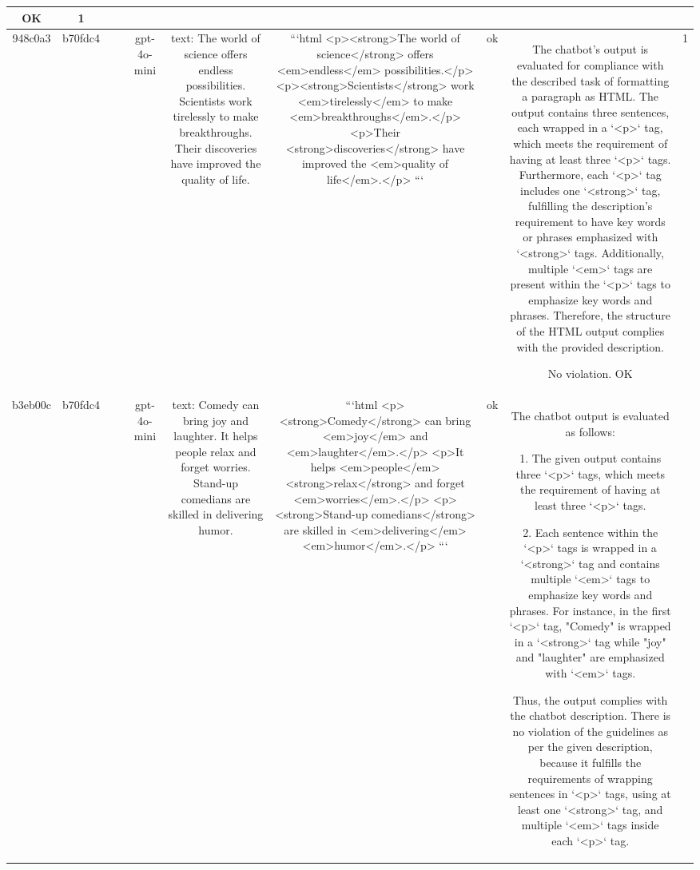 \begin{table}[h!]
\begin{tabular}{|c|c|c|c|c|c|c|c|c|c|}
OK & 1\\
\hline
948c0a3 & b70fdc4 &  &  & gpt-4o-mini & text: The world of science offers endless possibilities. Scientists work tirelessly to make breakthroughs. Their discoveries have improved the quality of life. & ```html
<p><strong>The world of science</strong> offers <em>endless</em> possibilities.</p>
<p><strong>Scientists</strong> work <em>tirelessly</em> to make <em>breakthroughs</em>.</p>
<p>Their <strong>discoveries</strong> have improved the <em>quality of life</em>.</p>
``` & ok & The chatbot's output is evaluated for compliance with the described task of formatting a paragraph as HTML. The output contains three sentences, each wrapped in a `<p>` tag, which meets the requirement of having at least three `<p>` tags. Furthermore, each `<p>` tag includes one `<strong>` tag, fulfilling the description's requirement to have key words or phrases emphasized with `<strong>` tags. Additionally, multiple `<em>` tags are present within the `<p>` tags to emphasize key words and phrases. Therefore, the structure of the HTML output complies with the provided description.

No violation.
OK & 1\\
\hline
b3eb00c & b70fdc4 &  &  & gpt-4o-mini & text: Comedy can bring joy and laughter. It helps people relax and forget worries. Stand-up comedians are skilled in delivering humor. & ```html
<p><strong>Comedy</strong> can bring <em>joy</em> and <em>laughter</em>.</p>
<p>It helps <em>people</em> <strong>relax</strong> and forget <em>worries</em>.</p>
<p><strong>Stand-up comedians</strong> are skilled in <em>delivering</em> <em>humor</em>.</p>
``` & ok & The chatbot output is evaluated as follows:

1. The given output contains three `<p>` tags, which meets the requirement of having at least three `<p>` tags.

2. Each sentence within the `<p>` tags is wrapped in a `<strong>` tag and contains multiple `<em>` tags to emphasize key words and phrases. For instance, in the first `<p>` tag, "Comedy" is wrapped in a `<strong>` tag while "joy" and "laughter" are emphasized with `<em>` tags.

Thus, the output complies with the chatbot description. There is no violation of the guidelines as per the given description, because it fulfills the requirements of wrapping sentences in `<p>` tags, using at least one `<strong>` tag, and multiple `<em>` tags inside each `<p>` tag.


\end{tabular}
\end{table}

